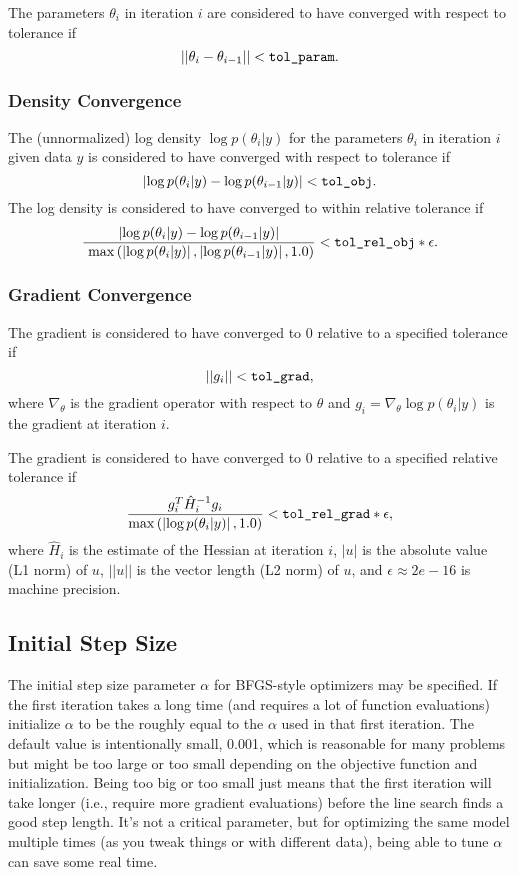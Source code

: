 The parameters $\theta_i$ in iteration $i$ are considered to have
converged with respect to tolerance  if
%
\[
|| \theta_{i} - \theta_{i-1} || < \mbox{\code{tol\_param}}.
\]


\subsubsection{Density Convergence}
%
The (unnormalized) log density
$\log p(\theta_{i}|y)$ for the parameters $\theta_i$ in iteration $i$
given data $y$ is considered to have converged with
respect to tolerance  if
%
\[
\left| \log p(\theta_{i}|y) - \log p(\theta_{i-1}|y) \right| <
\mbox{\code{tol\_obj}}.
\]
%
The log density is considered to have converged to within
relative tolerance  if
%
\[
\frac{\left| \log p(\theta_{i}|y) - \log p(\theta_{i-1}|y) \right|}{\
  \max\left(\left| \log p(\theta_{i}|y)\right|,\left| \log
      p(\theta_{i-1}|y)\right|,1.0\right)}
 < \mbox{\code{tol\_rel\_obj}} * \epsilon.
\]
%


\subsubsection{Gradient Convergence}

The gradient is considered to have converged to 0 relative to a
specified tolerance  if
%
\[
|| g_{i} || < \mbox{\code{tol\_grad}},
\]
where $\nabla_{\theta}$ is the gradient operator with respect to
$\theta$ and $g_{i} = \nabla_{\theta} \log p(\theta_{i}|y)$ is the gradient at
iteration $i$.

The gradient is considered to have converged to 0 relative to a
specified relative tolerance
 if
%
\[
\frac{g_{i}^T \hat{H}_{i}^{-1} g_{i} }{ \max\left(\left|\log p(\theta_{i}|y)\right|,1.0\right) } < \mbox{\code{tol\_rel\_grad}} * \epsilon,
\]
%
where $\hat{H}_{i}$ is the estimate of the Hessian at iteration $i$,
$|u|$ is the absolute value (L1 norm) of $u$, $||u||$ is the vector
length (L2 norm) of $u$, and $\epsilon \approx 2e-16$ is machine
precision.


\subsection{Initial Step Size}

The initial step size parameter $\alpha$ for BFGS-style optimizers may
be specified. If the first iteration takes a long time (and requires a
lot of function evaluations) initialize $\alpha$ to be the roughly
equal to the $\alpha$ used in that first iteration. The default value
is intentionally small, 0.001, which is reasonable for many problems
but might be too large or too small depending on the objective
function and initialization. Being too big or too small just means
that the first iteration will take longer (i.e., require more gradient
evaluations) before the line search finds a good step length. It's not
a critical parameter, but for optimizing the same model multiple times
(as you tweak things or with different data), being able to tune
$\alpha$ can save some real time.

